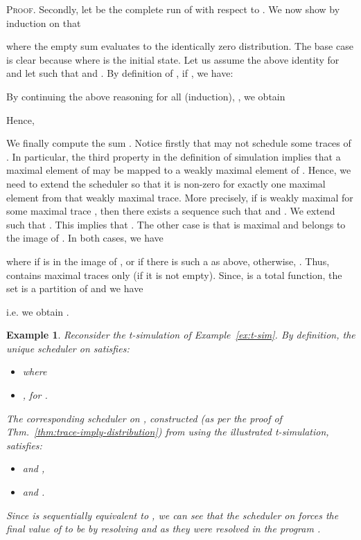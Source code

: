 \documentclass[review]{elsart}
\newtheorem{example}[definition]{Example}
\newenvironment{proof}{\par
\noindent
\textsc{Proof. }
\noindent}{\hfill}
\newcommand{\Thm}[1]{Thm.~\ref{#1}}
\begin{document}
\begin{proof}
Secondly, let  be the complete run of  with respect to . We now show by induction on  that 

where the empty sum evaluates to the identically zero distribution. The base case is clear because  where  is the initial state. Let us assume the above identity for  and let  such that  and . By definition of , if , we have:
\begin{footnotesize}

\end{footnotesize}
By continuing the above reasoning for all  (induction), , we obtain 

Hence, 

 We finally compute the sum . Notice firstly that  may not schedule some traces of . In particular, the third property in the definition of simulation implies that a maximal element of  may be mapped to a weakly maximal element of . Hence, we need to extend the scheduler  so that it is non-zero for exactly one maximal element from that weakly maximal trace. More precisely, if  is weakly maximal for some maximal trace , then there exists a sequence  such that  and . We extend  such that . This implies that . The other case is that  is maximal and belongs to the image of . In both cases, we have 

where  if  is in the image of , or  if there is such a  as above, otherwise, . Thus,  contains maximal traces only (if it is not empty). Since,  is a total function, the set  is a partition of  and we have 

i.e. we obtain .
\end{proof}

\begin{example}
Reconsider the t-simulation of Example~\ref{ex:t-sim}. By definition, the unique scheduler  on  satisfies:
\begin{itemize}
\item[-]  where

\item[-] , for .
\end{itemize}
The corresponding scheduler  on , constructed (as per the proof of \Thm{thm:trace-imply-distribution}) from  using the illustrated t-simulation, satisfies:
\begin{itemize}
\item[-]  and ,
\item[-]  and .
\end{itemize}
Since  is sequentially equivalent to , we can see that the scheduler  on  forces the final value of  to be  by resolving  and  as they were resolved in the program .
\end{example}
\end{document}
